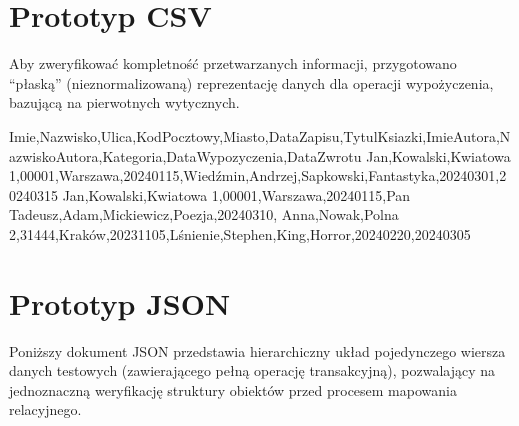 \documentclass[a4paper,11pt,english,openany,oneside]{sphinxmanual}
\begin{document}
\section{Prototyp CSV}
\label{\detokenize{rozdzial_3/index:prototyp-csv}}
\sphinxAtStartPar
Aby zweryfikować kompletność przetwarzanych informacji, przygotowano “płaską” (nieznormalizowaną) reprezentację danych dla operacji wypożyczenia, bazującą na pierwotnych wytycznych.

\begin{sphinxVerbatim}[commandchars=\\\{\}]
Imie,Nazwisko,Ulica,Kod\PYGZus{}Pocztowy,Miasto,Data\PYGZus{}Zapisu,Tytul\PYGZus{}Ksiazki,Imie\PYGZus{}Autora,Nazwisko\PYGZus{}Autora,Kategoria,Data\PYGZus{}Wypozyczenia,Data\PYGZus{}Zwrotu
Jan,Kowalski,Kwiatowa 1,00\PYGZhy{}001,Warszawa,2024\PYGZhy{}01\PYGZhy{}15,Wiedźmin,Andrzej,Sapkowski,Fantastyka,2024\PYGZhy{}03\PYGZhy{}01,2024\PYGZhy{}03\PYGZhy{}15
Jan,Kowalski,Kwiatowa 1,00\PYGZhy{}001,Warszawa,2024\PYGZhy{}01\PYGZhy{}15,Pan Tadeusz,Adam,Mickiewicz,Poezja,2024\PYGZhy{}03\PYGZhy{}10,
Anna,Nowak,Polna 2,31\PYGZhy{}444,Kraków,2023\PYGZhy{}11\PYGZhy{}05,Lśnienie,Stephen,King,Horror,2024\PYGZhy{}02\PYGZhy{}20,2024\PYGZhy{}03\PYGZhy{}05
\end{sphinxVerbatim}


\section{Prototyp JSON}
\label{\detokenize{rozdzial_3/index:prototyp-json}}
\sphinxAtStartPar
Poniższy dokument JSON przedstawia hierarchiczny układ pojedynczego wiersza danych testowych (zawierającego pełną operację transakcyjną), pozwalający na jednoznaczną weryfikację struktury obiektów przed procesem mapowania relacyjnego.
\end{document}
